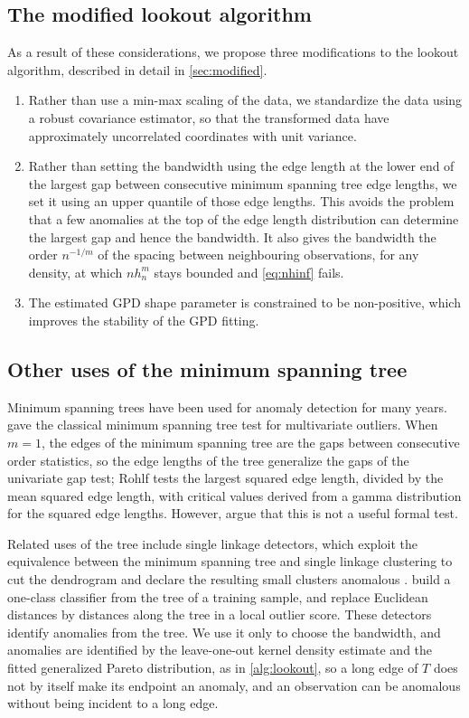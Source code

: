 \subsection{The modified lookout algorithm}

As a result of these considerations, we propose three modifications to the lookout algorithm, described in detail in \cref{sec:modified}.

\begin{enumerate}
  \item Rather than use a min-max scaling of the data, we standardize the data using a robust covariance estimator, so that the transformed data have approximately uncorrelated coordinates with unit variance.
  \item Rather than setting the bandwidth using the edge length at the lower end of the largest gap between consecutive minimum spanning tree edge lengths, we set it using an upper quantile of those edge lengths. This avoids the problem that a few anomalies at the top of the edge length distribution can determine the largest gap and hence the bandwidth. It also gives the bandwidth the order $n^{-1/m}$ of the spacing between neighbouring observations, for any density, at which $nh_n^m$ stays bounded and \eqref{eq:nhinf} fails.
  \item The estimated GPD shape parameter is constrained to be non-positive, which improves the stability of the GPD fitting.
\end{enumerate}

\subsection{Other uses of the minimum spanning tree}\label{sec:related}

Minimum spanning trees have been used for anomaly detection for many years.
\citet{Rohlf1975} gave the classical minimum spanning tree test for multivariate outliers. When $m=1$, the edges of the minimum spanning tree are the gaps between consecutive order statistics, so the edge lengths of the tree generalize the gaps of the univariate gap test; Rohlf tests the largest squared edge length, divided by the mean squared edge length, with critical values derived from a gamma distribution for the squared edge lengths. However, \citet{caroni1995rohlf} argue that this is not a useful formal test.

Related uses of the tree include single linkage detectors, which exploit the equivalence between the minimum spanning tree and single linkage clustering \citep{Gower1969} to cut the dendrogram and declare the resulting small clusters anomalous \citep{Jiang2001}. \citet{Juszczak2009} build a one-class classifier from the tree of a training sample, and \citet{Ahmed2019} replace Euclidean distances by distances along the tree in a local outlier score. These detectors identify anomalies from the tree. We use it only to choose the bandwidth, and anomalies are identified by the leave-one-out kernel density estimate and the fitted generalized Pareto distribution, as in \cref{alg:lookout}, so a long edge of $T$ does not by itself make its endpoint an anomaly, and an observation can be anomalous without being incident to a long edge.

